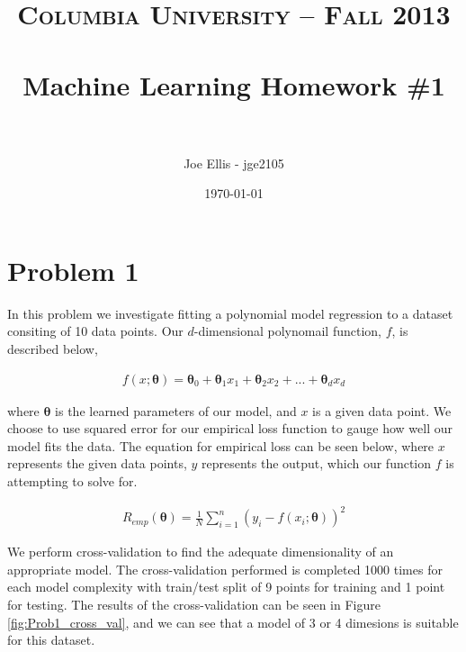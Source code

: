\documentclass[paper=a4, fontsize=11pt]{scrartcl} %
\title{	
\normalfont \normalsize 
\textsc{Columbia University -- Fall 2013} \\ [25pt] %
\horrule{0.5pt} \\[0.4cm] %
\huge Machine Learning Homework \#1\\ %
\horrule{2pt} \\[0.5cm] %
}
\author{Joe Ellis - jge2105} %
\date{\normalsize\today} %
\begin{document}
\maketitle %


\section{Problem 1}

In this problem we investigate fitting a polynomial model regression to a dataset consiting of 10 data points.  
Our $d$-dimensional polynomail function, $f$, is described below, 

\begin{align} 
f(x;\bm{\theta}) = \bm{\theta}_{0}	+ \bm{\theta}_{1}x_{1} + \bm{\theta}_{2}x_{2} + ... + \bm{\theta}_{d}x_{d}		
\end{align}

where $\bm{\theta}$ is the learned parameters of our model, and $x$ is a given data point.
We choose to use squared error for our empirical loss function to gauge how well our model fits the data.  The equation for empirical loss can be seen below, where $x$ represents the given data points, $y$ represents the output, which our function $f$ is attempting to solve for.

\begin{align} 
R_{emp}(\bm{\theta}) = \frac{1}{N}\sum\limits_{i=1}^n (y_{i} - f(x_{i};\bm{\theta}))^{2}
\end{align}

We perform cross-validation to find the adequate dimensionality of an appropriate model.  
The cross-validation performed is completed 1000 times for each model complexity with train/test split of 9 points for training and 1 point for testing.  The results of the cross-validation can be seen in Figure \ref{fig:Prob1_cross_val}, and we can see that a model of 3 or 4 dimesions is suitable for this dataset. 
\end{document}
